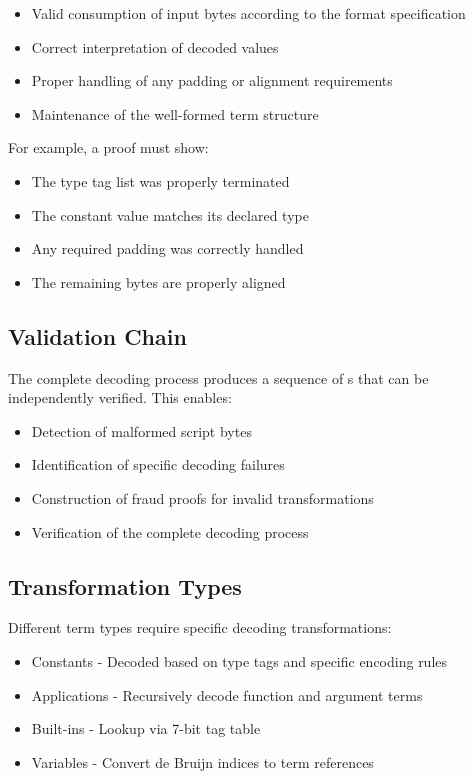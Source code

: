 \documentclass[../midgard.tex]{subfiles}
\begin{document}
\begin{itemize}
    \item Valid consumption of input bytes according to the format specification
    \item Correct interpretation of decoded values
    \item Proper handling of any padding or alignment requirements
    \item Maintenance of the well-formed term structure
\end{itemize}

For example, a  proof must show:
\begin{itemize}
    \item The type tag list was properly terminated
    \item The constant value matches its declared type
    \item Any required padding was correctly handled
    \item The remaining bytes are properly aligned
\end{itemize}

\subsection{Validation Chain}

The complete decoding process produces a sequence of s that can be independently verified. This enables:

\begin{itemize}
    \item Detection of malformed script bytes
    \item Identification of specific decoding failures
    \item Construction of fraud proofs for invalid transformations
    \item Verification of the complete decoding process
\end{itemize}

\subsection{Transformation Types}

Different term types require specific decoding transformations:

\begin{itemize}
    \item Constants - Decoded based on type tags and specific encoding rules
    \item Applications - Recursively decode function and argument terms
    \item Built-ins - Lookup via 7-bit tag table
    \item Variables - Convert de Bruijn indices to term references
\end{itemize}
\end{document}

